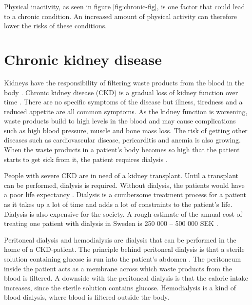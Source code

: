 \documentclass{cslthse-msc}
\begin{document}
Physical inactivity, as seen in figure \ref{fig:chronic-fig}, is one factor that could lead to a chronic condition. An increased amount of physical activity can therefore lower the risks of these conditions.

\section{Chronic kidney disease}
\label{sec:kiney}

Kidneys have the responsibility of filtering waste products from the blood in the body \cite{NKDEPBASICS}. Chronic kidney disease (CKD) is a gradual loss of kidney function over time \cite{KIDNEYFOUNDATION}. There are no specific symptoms of the disease but illness, tiredness and a reduced appetite are all common symptoms. As the kidney function is worsening, waste products build to high levels in the blood and may cause complications such as high blood pressure,  muscle and bone mass loss. The risk of getting other diseases such as cardiovascular disease, pericarditis and anemia is also growing.  When the waste products in a patient’s body becomes so high that the patient starts to get sick from it, the patient requires dialysis \cite{KIDNEYFOUNDATION}.%

People with severe CKD are in need of a kidney transplant. Until a transplant can be performed, dialysis is required. Without dialysis, the patients would have a poor life expectancy \cite{KIDNEYFOUNDATION}. Dialysis is a cumbersome treatment process for a patient as it takes up a lot of time and adds a lot of constraints to the patient’s life. Dialysis is also expensive for the society. A rough estimate of the annual cost of treating one patient with dialysis in Sweden is 250 000 – 500 000 SEK \cite{sr}. 

Peritoneal dialysis and hemodialysis are dialysis that can be performed in the home of a CKD-patient. The principle behind peritoneal dialysis is that a sterile solution containing glucose is run into the patient’s abdomen \cite{DIALYSIS}. The peritoneum inside the patient acts as a membrane across which waste products from the blood is filtered. A downside with the peritoneal dialysis is that the calorie intake increases, since the sterile solution contains glucose. Hemodialysis is a kind of blood dialysis, where blood is filtered outside the body.
\end{document}
